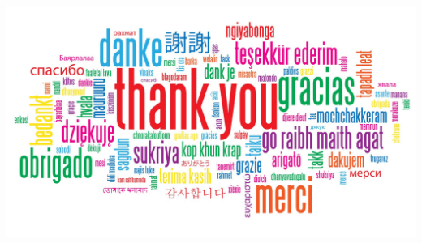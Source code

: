 \documentclass[pdflatex,compress]{beamer}
\begin{document}
\begin{frame}
	\begin{center}
		\includegraphics[width=\linewidth]{img/img010}
	\end{center}
\end{frame}
\end{document}
